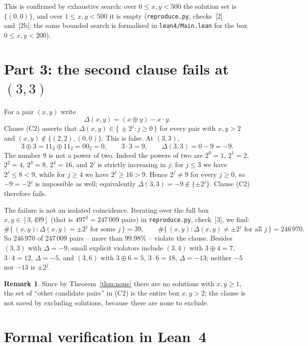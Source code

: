 \documentclass[11pt]{article}
\theoremstyle{definition}
\newtheorem{remark}[theorem]{Remark}
\newcommand{\xor}{\oplus}
\begin{document}
This is confirmed by exhaustive search: over $0 \le x, y < 500$ the solution
set is $\{(0,0)\}$, and over $1 \le x, y < 500$ it is empty
(\texttt{reproduce.py}, checks~[2] and~[2b]; the same bounded search is
formalised in \texttt{lean4/Main.lean} for the box $0 \le x, y < 200$).

\section{Part 3: the second clause fails at $(3,3)$}\label{sec:clause2}

For a pair $(x, y)$ write
\[
  \Delta(x, y) = (x \xor y) - x \cdot y .
\]
Clause (C2) asserts that $\Delta(x, y) \in \{\, \pm 2^{j} : j \ge 0 \,\}$ for
every pair with $x, y > 2$ and $(x, y) \notin \{(2,2), (0,0)\}$.  This is
false.  At $(3,3)$,
\[
  3 \xor 3 = 11_{2} \xor 11_{2} = 00_{2} = 0,
  \qquad 3 \cdot 3 = 9,
  \qquad \Delta(3,3) = 0 - 9 = -9 .
\]
The number $9$ is not a power of two.  Indeed the powers of two are
$2^{0} = 1$, $2^{1} = 2$, $2^{2} = 4$, $2^{3} = 8$, $2^{4} = 16$, and
$2^{j}$ is strictly increasing in $j$: for $j \le 3$ we have $2^{j} \le 8 < 9$,
while for $j \ge 4$ we have $2^{j} \ge 16 > 9$.  Hence $2^{j} \ne 9$ for every
$j \ge 0$, so $-9 = -2^{j}$ is impossible as well; equivalently
$\Delta(3,3) = -9 \notin \{\pm 2^{j}\}$.  Clause (C2) therefore fails.

The failure is not an isolated coincidence.  Iterating over the full box
$x, y \in [3, 499]$ (that is $497^{2} = 247\,009$ pairs) in
\texttt{reproduce.py}, check~[3], we find:
\[
  \#\{\, (x, y) : \Delta(x, y) = \pm 2^{j} \text{ for some } j \,\} = 39,
  \qquad
  \#\{\, (x, y) : \Delta(x, y) \ne \pm 2^{j} \text{ for all } j \,\}
  = 246\,970 .
\]
So $246\,970$ of $247\,009$ pairs -- more than $99.98\%$ -- violate the
clause.  Besides $(3,3)$ with $\Delta = -9$, small explicit violators include
$(3,4)$ with $3 \xor 4 = 7$, $3 \cdot 4 = 12$, $\Delta = -5$, and $(3,6)$ with
$3 \xor 6 = 5$, $3 \cdot 6 = 18$, $\Delta = -13$; neither $-5$ nor $-13$ is
$\pm 2^{j}$.

\begin{remark}
Since by Theorem~\ref{thm:none} there are no solutions with $x, y \ge 1$, the
set of ``other candidate pairs'' in (C2) is the entire box $x, y > 2$; the
clause is not saved by excluding solutions, because there are none to exclude.
\end{remark}

\section{Formal verification in Lean~4}\label{sec:lean}
\end{document}

